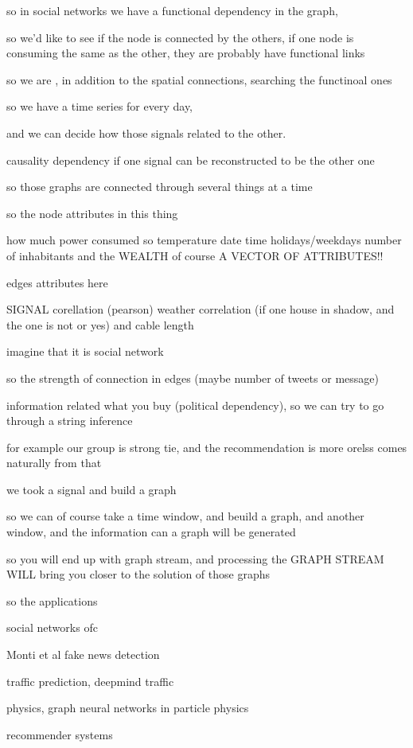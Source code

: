 \documentclass{article}
\begin{document}
so in social networks we have a functional dependency in the graph, 

so we'd like to see if the node is connected by the others, if one node is consuming the same as the other, they are probably have functional links

so we are , in addition to the spatial connections, searching the functinoal ones


so we have a time series for every day, 

and we can decide how those signals  related to the other. 

causality dependency if one signal can be reconstructed to be the other one

so those graphs are connected through several things at a time


so the node attributes in this thing

how much power consumed
so temperature
date time 
holidays/weekdays
number of inhabitants 
and the WEALTH of course 
A VECTOR OF ATTRIBUTES!!

edges attributes here

SIGNAL corellation (pearson)
weather correlation  (if one house in shadow, and the one is not or yes)
and cable length

imagine that it is social network

so the strength of connection in edges (maybe number of tweets or message)

information related what you buy (political dependency), so we can try to go through a string inference

for example our group is strong tie, and the recommendation is more orelss comes naturally from that

we took a signal and build a graph

so we can of course take a time window, and beuild a graph, and another window, and the information can a graph will be generated

so you will end up with graph stream, and processing the GRAPH STREAM WILL bring you closer to the solution of those graphs

so the applications

social networks ofc

Monti et al fake news detection

traffic prediction, deepmind traffic 

physics, graph neural networks in particle physics


recommender systems 
\end{document}
